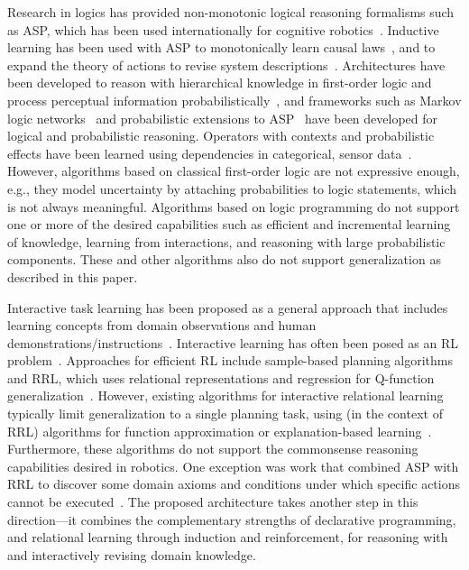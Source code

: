 \documentclass{article}
\begin{document}
Research in logics has provided non-monotonic logical reasoning
formalisms such as ASP, which has been used internationally for
cognitive robotics~\cite{erdem:bookchap12,balduccini:nmr14}.
Inductive learning has been used with ASP to monotonically learn
causal laws~\cite{otero:ilp03}, and to expand the theory of actions to
revise system descriptions~\cite{balduccini:aaaisymp07}.
Architectures have been developed to reason with hierarchical
knowledge in first-order logic and process perceptual information
probabilistically~\cite{Laird:agi08,Langley:aaai06,Talamadupula:TIST10},
and frameworks such as Markov logic networks~\cite{richardson:ML06}
and probabilistic extensions to ASP~\cite{baral:TPLP09,lee:aaaisss15}
have been developed for logical and probabilistic reasoning. Operators
with contexts and probabilistic effects have been learned using
dependencies in categorical, sensor data~\cite{oates:aaai96}.
However, algorithms based on classical first-order logic are not
expressive enough, e.g., they model uncertainty by attaching
probabilities to logic statements, which is not always meaningful.
Algorithms based on logic programming do not support one or more of
the desired capabilities such as efficient and incremental learning of
knowledge, learning from interactions, and reasoning with large
probabilistic components. These and other algorithms also do not
support generalization as described in this paper.

Interactive task learning has been proposed as a general approach that
includes learning concepts from domain observations and human
demonstrations/instructions~\cite{kirk:BICA16}.  Interactive learning
has often been posed as an RL problem~\cite{sutton:RL98}.  Approaches
for efficient RL include sample-based planning
algorithms~\cite{walsh:aaai10} and RRL, which uses relational
representations and regression for Q-function
generalization~\cite{driessens:icml03,tadepalli:icmlwrksp04}. However,
existing algorithms for interactive relational learning typically
limit generalization to a single planning task, using (in the context
of RRL) algorithms for function approximation or explanation-based
learning~\cite{boutilier:ijcai01,driessens:icml03,bloch:rldm17}.
Furthermore, these algorithms do not support the commonsense reasoning
capabilities desired in robotics. One exception was work that combined
ASP with RRL to discover some domain axioms and conditions under which
specific actions cannot be executed~\cite{mohan:icaps17}. The proposed
architecture takes another step in this direction---it combines the
complementary strengths of declarative programming, and relational
learning through induction and reinforcement, for reasoning with and
interactively revising domain knowledge.
\end{document}
